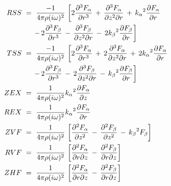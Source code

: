 \documentclass{article}
\begin{document}
\begin{align*}
RSS \   &= \  { \frac{-1 }{ { 4 \pi \rho ( i \omega )^2 } }} \, \left[ 2 { \frac{ \partial^3 F_{\alpha}   }{  \partial r^3 } } \,+\, { \frac{ \partial^3 F_{\alpha}   }{  \partial {\it z}^2 \partial r } } \,+\, {{ k_{\alpha} }}^2 { \frac{ \partial F_{\alpha}   }{  \partial r } } \right . \\
& \left.  \ \ \ \,-\, 2 { \frac{ \partial^3 F_{\beta}   }{  \partial r^3 } } \,-\, { \frac{ \partial^3 F_{\beta}   }{  \partial {\it z}^2 \partial r } } \,-\,2 {{ k_{\beta} }}^2 { \frac{ \partial F_{\beta}   }{  \partial r } } \right] \, \\
TSS \   &= \  { \frac{-1 }{ { 4 \pi \rho ( i \omega )^2 } }} \, \left[ 2 { \frac{ \partial^3 F_{\alpha}   }{  \partial r^3 } } \,+\,2 { \frac{ \partial^3 F_{\alpha}   }{  \partial {\it z}^2 \partial r } } \,+\,2 {{ k_{\alpha} }}^2 { \frac{ \partial F_{\alpha}   }{  \partial r } } \right . \\
& \left.  \ \ \ \,-\, 2 { \frac{ \partial^3 F_{\beta}   }{  \partial r^3 } }  \,-\,2 { \frac{ \partial^3 F_{\beta}   }{  \partial {\it z}^2 \partial r } } \,-\, {{ k_{\beta} }}^2 { \frac{ \partial F_{\beta}   }{  \partial r } } \right] \, \\
ZEX \   &= \   { \frac{1 }{  4 \pi \rho ( i \omega )^2 } } {{ k_{\alpha} }}^2 { \frac{ \partial F_{\alpha}   }{  \partial {\it z} } } \\
REX \   &= \   { \frac{1 }{  4 \pi \rho ( i \omega )^2 }} {{ k_{\alpha} }}^2 { \frac{ \partial F_{\alpha}   }{  \partial r } } \\
ZVF \   &= \  { \frac{1 }{  { 4 \pi \rho ( i \omega )^2 } } } \, \left[ { \frac{ \partial^2 F_{\alpha}   }{  \partial {\it z}^2 } } \,-\, { \frac{ \partial^2 F_{\beta}   }{  \partial {\it z}^2 } } \,-\, {{ k_{\beta} }}^2 { { F_{\beta} }} \right] \, \\
RVF \   &= \  { \frac{1 }{  { 4 \pi \rho ( i \omega )^2 } } } \, \left[ { \frac{ \partial^2 F_{\alpha}   }{  \partial r \partial {\it z} } } \,-\, { \frac{ \partial^2 F_{\beta}   }{  \partial r \partial {\it z} } }  \right] \, \\
ZHF \   &= \  { \frac{1 }{  { 4 \pi \rho ( i \omega )^2 } } } \, \left[ { \frac{ \partial^2 F_{\alpha}   }{  \partial r \partial {\it z} } } \,-\, { \frac{ \partial^2 F_{\beta}   }{  \partial r \partial {\it z} } }  \right] \, \\

\end{align*}
\end{document}
